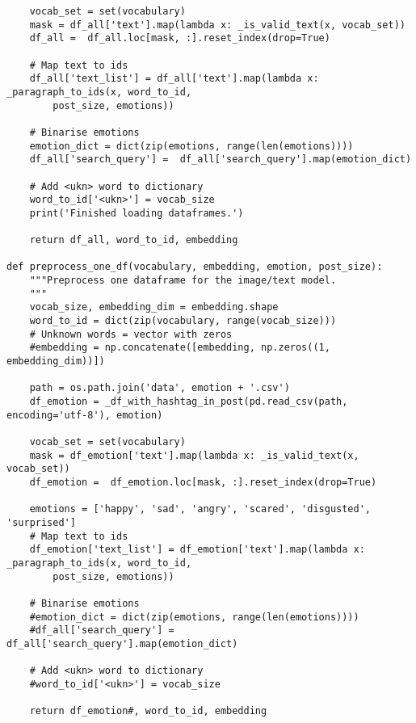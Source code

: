 \begin{lstlisting}
    vocab_set = set(vocabulary)
    mask = df_all['text'].map(lambda x: _is_valid_text(x, vocab_set))
    df_all =  df_all.loc[mask, :].reset_index(drop=True)

    # Map text to ids
    df_all['text_list'] = df_all['text'].map(lambda x: _paragraph_to_ids(x, word_to_id, 
        post_size, emotions))

    # Binarise emotions
    emotion_dict = dict(zip(emotions, range(len(emotions))))
    df_all['search_query'] =  df_all['search_query'].map(emotion_dict)

    # Add <ukn> word to dictionary
    word_to_id['<ukn>'] = vocab_size
    print('Finished loading dataframes.')

    return df_all, word_to_id, embedding

def preprocess_one_df(vocabulary, embedding, emotion, post_size):
    """Preprocess one dataframe for the image/text model.
    """
    vocab_size, embedding_dim = embedding.shape
    word_to_id = dict(zip(vocabulary, range(vocab_size)))
    # Unknown words = vector with zeros
    #embedding = np.concatenate([embedding, np.zeros((1, embedding_dim))])

    path = os.path.join('data', emotion + '.csv')
    df_emotion = _df_with_hashtag_in_post(pd.read_csv(path, encoding='utf-8'), emotion)

    vocab_set = set(vocabulary)
    mask = df_emotion['text'].map(lambda x: _is_valid_text(x, vocab_set))
    df_emotion =  df_emotion.loc[mask, :].reset_index(drop=True)

    emotions = ['happy', 'sad', 'angry', 'scared', 'disgusted', 'surprised']
    # Map text to ids
    df_emotion['text_list'] = df_emotion['text'].map(lambda x: _paragraph_to_ids(x, word_to_id, 
        post_size, emotions))

    # Binarise emotions
    #emotion_dict = dict(zip(emotions, range(len(emotions))))
    #df_all['search_query'] =  df_all['search_query'].map(emotion_dict)

    # Add <ukn> word to dictionary
    #word_to_id['<ukn>'] = vocab_size

    return df_emotion#, word_to_id, embedding
\end{lstlisting}

